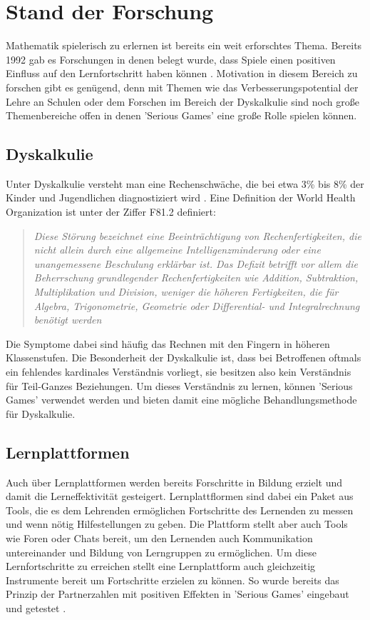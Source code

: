 
\chapter{Stand der Forschung}
Mathematik spielerisch zu erlernen ist bereits ein weit erforschtes Thema. Bereits 1992 gab es Forschungen in denen belegt wurde, dass Spiele einen positiven Einfluss auf den Lernfortschritt haben können \cite{Randel1992}. Motivation in diesem Bereich zu forschen gibt es genügend, denn mit Themen wie das Verbesserungspotential der Lehre an Schulen \cite{moeslein2018} oder dem Forschen im Bereich der Dyskalkulie \cite{wilms2015} sind noch große Themenbereiche offen in denen 'Serious Games' eine große Rolle spielen können.
\section{Dyskalkulie}
Unter Dyskalkulie versteht man eine Rechenschwäche, die bei etwa 3\% bis 8\% der Kinder und Jugendlichen diagnostiziert wird \cite{Dyskalkulie2018}. Eine Definition der World Health Organization ist unter der Ziffer F81.2 definiert:
\begin{quote}
\textit{ Diese Störung bezeichnet eine Beeinträchtigung von Rechenfertigkeiten, die nicht allein durch eine allgemeine Intelligenzminderung oder eine unangemessene Beschulung erklärbar ist. Das Defizit betrifft vor allem die Beherrschung grundlegender Rechenfertigkeiten wie Addition, Subtraktion, Multiplikation und Division, weniger die höheren Fertigkeiten, die für Algebra, Trigonometrie, Geometrie oder Differential- und Integralrechnung benötigt werden }
\end{quote}
Die Symptome dabei sind häufig das Rechnen mit den Fingern in höheren Klassenstufen. Die Besonderheit der Dyskalkulie ist, dass bei Betroffenen oftmals ein fehlendes kardinales Verständnis vorliegt\cite{fritz2009}, sie besitzen also kein Verständnis für Teil-Ganzes Beziehungen. Um dieses Verständnis zu lernen, können 'Serious Games' verwendet werden\cite{Sch2016} und bieten damit eine mögliche Behandlungsmethode für Dyskalkulie.
\section{Lernplattformen}
Auch über Lernplattformen werden bereits Forschritte in Bildung erzielt und damit die Lerneffektivität gesteigert. Lernplattflormen sind dabei ein Paket aus Tools, die es dem Lehrenden ermöglichen Fortschritte des Lernenden zu messen und wenn nötig Hilfestellungen zu geben. Die Plattform stellt aber auch Tools wie Foren oder Chats bereit, um den Lernenden auch Kommunikation untereinander und Bildung von Lerngruppen zu ermöglichen. Um diese Lernfortschritte zu erreichen stellt eine Lernplattform auch gleichzeitig Instrumente bereit um Fortschritte erzielen zu können. So wurde bereits das Prinzip der Partnerzahlen mit positiven Effekten in 'Serious Games' eingebaut und getestet \cite{JUNG2015}.

